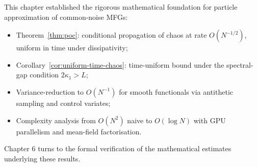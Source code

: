 This chapter established the rigorous mathematical foundation for particle
approximation of common-noise MFGs:
\begin{itemize}
    \item Theorem~\ref{thm:poc}: conditional propagation of chaos at rate
    $O(N^{-1/2})$, uniform in time under dissipativity;
    \item Corollary~\ref{cor:uniform-time-chaos}: time-uniform bound under the
    spectral-gap condition $2\kappa_1 > L$;
    \item Variance-reduction to $O(N^{-1})$ for smooth functionals via antithetic
    sampling and control variates;
    \item Complexity analysis from $O(N^2)$ naive to $O(\log N)$ with GPU
    parallelism and mean-field factorisation.
\end{itemize}
Chapter 6 turns to the formal verification of the mathematical estimates underlying
these results.
